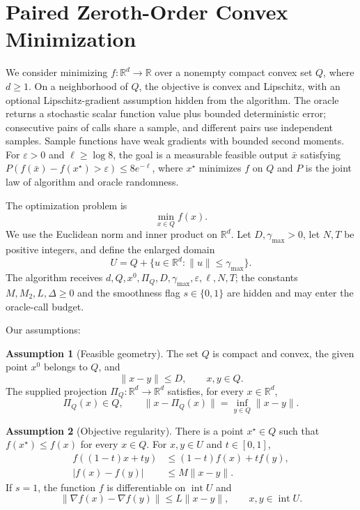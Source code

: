 \documentclass[10pt]{article}
\theoremstyle{definition}
\newtheorem{assumption}{Assumption}
\begin{document}
\section*{Paired Zeroth-Order Convex Minimization}
We consider minimizing $f:\mathbb{R}^d\to\mathbb{R}$ over a nonempty compact convex set $Q$, where $d\geq1$. On a neighborhood of $Q$, the objective is convex and Lipschitz, with an optional Lipschitz-gradient assumption hidden from the algorithm. The oracle returns a stochastic scalar function value plus bounded deterministic error; consecutive pairs of calls share a sample, and different pairs use independent samples. Sample functions have weak gradients with bounded second moments. For $\varepsilon>0$ and $\ell\geq\log 8$, the goal is a measurable feasible output $\bar{x}$ satisfying $P(f(\bar{x})-f(x^\star)>\varepsilon)\leq8e^{-\ell}$, where $x^\star$ minimizes $f$ on $Q$ and $P$ is the joint law of algorithm and oracle randomness.

The optimization problem is
\[
\min_{x\in Q} f(x).
\]
We use the Euclidean norm and inner product on $\mathbb{R}^d$. Let $D,\gamma_{\max}>0$, let $N,T$ be positive integers, and define the enlarged domain
\[
U=Q+\{u\in\mathbb{R}^d:\|u\|\leq\gamma_{\max}\}.
\]
The algorithm receives $d,Q,x^0,\Pi_Q,D,\gamma_{\max},\varepsilon,\ell,N,T$; the constants $M,M_2,L,\Delta\geq0$ and the smoothness flag $s\in\{0,1\}$ are hidden and may enter the oracle-call budget.

Our assumptions:
\begin{assumption}[Feasible geometry]
The set $Q$ is compact and convex, the given point $x^0$ belongs to $Q$, and
\[
\|x-y\|\leq D,\qquad x,y\in Q.
\]
The supplied projection $\Pi_Q:\mathbb{R}^d\to\mathbb{R}^d$ satisfies, for every $x\in\mathbb{R}^d$,
\[
\Pi_Q(x)\in Q,
\qquad
\|x-\Pi_Q(x)\|=\inf_{y\in Q}\|x-y\|.
\]
\end{assumption}

\begin{assumption}[Objective regularity]
There is a point $x^\star\in Q$ such that $f(x^\star)\leq f(x)$ for every $x\in Q$. For $x,y\in U$ and $t\in[0,1]$,
\[
\begin{aligned}
f((1-t)x+ty)&\leq(1-t)f(x)+tf(y),\\
|f(x)-f(y)|&\leq M\|x-y\|.
\end{aligned}
\]
If $s=1$, the function $f$ is differentiable on $\operatorname{int}U$ and
\[
\|\nabla f(x)-\nabla f(y)\|\leq L\|x-y\|,
\qquad x,y\in\operatorname{int}U.
\]
\end{assumption}
\end{document}
